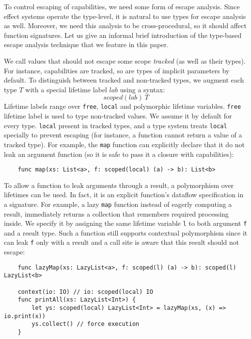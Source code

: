 \documentclass[acmsmall]{acmart}
\newcommand{\ap}{~}
\begin{document}
To control escaping of capabilities, we need some form of escape analysis. %
Since effect systems operate the type-level, it is natural to use types for escape analysis as well.
Moreover, we need this analysis to be cross-procedural, so it should affect function signatures.
Let us give an informal brief introduction of the type-based escape analysis technique that we feature in this paper.

We call values that should not escape some scope \textit{tracked} (as well as their types).
For instance, capabilities are tracked, so are types of implicit parameters by default.
To distinguish between tracked and non-tracked types, we augment each type $T$ with a special lifetime label $lab$ using a syntax: \[scoped(lab)\ap T\]
Lifetime labels range over \texttt{free}, \texttt{local} and polymorphic lifetime variables.
\texttt{free} lifetime label is used to type non-tracked values.
We assume it by default for every type.
\texttt{local} present in tracked types, and a type system treats \texttt{local} specially to prevent escaping (for instance, a function cannot return a value of a tracked type).
For example, the \texttt{map} function can explicitly declare that it do not leak an argument function (so it is safe to pass it a closure with capabilities):
\begin{verbatim}
    func map(xs: List<a>, f: scoped(local) (a) -> b): List<b>
\end{verbatim}

To allow a function to leak arguments through a result, a polymorphism over lifetimes can be used.
In fact, it is an explicit function's dataflow specification in a signature. %
For example, a lazy \texttt{map} function instead of eagerly computing a result, immediately returns a collection that remembers required processing inside.
We specify it by assigning the same lifetime variable \texttt{l} to both argument \texttt{f} and a result type.
Such a function still supports contextual polymorphism since it can leak \texttt{f} only with a result and a call site is aware that this result should not escape:
\begin{verbatim}
    func lazyMap(xs: LazyList<a>, f: scoped(l) (a) -> b): scoped(l) LazyList<b>

    context(io: IO) // io: scoped(local) IO
    func printAll(xs: LazyList<Int>) {
        let ys: scoped(local) LazyList<Int> = lazyMap(xs, (x) => io.print(x))
        ys.collect() // force execution
    }
\end{verbatim}
\end{document}
